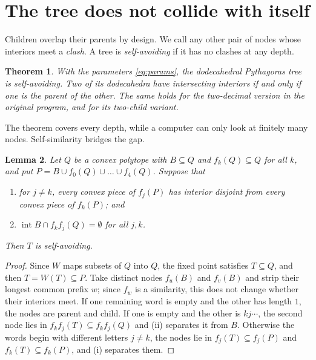 \documentclass[12pt]{article}
\theoremstyle{plain}
\newtheorem{theorem}{Theorem}
\newtheorem{lemma}[theorem]{Lemma}
\theoremstyle{remark}
\newcommand{\inter}{\operatorname{int}}
\begin{document}
\section{The tree does not collide with itself}\label{sec:avoid}

Children overlap their parents by design.  We call any other pair of nodes
whose interiors meet a \emph{clash}.  A tree is \emph{self-avoiding} if it has
no clashes at any depth.

\begin{theorem}\label{thm:avoid}
With the parameters \eqref{eq:params}, the dodecahedral Pythagoras tree is
self-avoiding.  Two of its dodecahedra have intersecting interiors if and only
if one is the parent of the other.  The same holds for the two-decimal version
in the original program, and for its two-child variant.
\end{theorem}

The theorem covers every depth, while a computer can only look at finitely many
nodes.  Self-similarity bridges the gap.

\begin{lemma}\label{lem:reduction}
Let $Q$ be a convex polytope with $B\subseteq Q$ and $f_k(Q)\subseteq Q$ for all
$k$, and put $P=B\cup f_0(Q)\cup\dots\cup f_4(Q)$.  Suppose that
\begin{enumerate}
\item[(i)] for $j\ne k$, every convex piece of $f_j(P)$ has interior disjoint
from every convex piece of $f_k(P)$; and
\item[(ii)] $\inter B\cap f_kf_j(Q)=\emptyset$ for all $j,k$.
\end{enumerate}
Then $T$ is self-avoiding.
\end{lemma}

\begin{proof}
Since $W$ maps subsets of $Q$ into $Q$, the fixed point satisfies $T\subseteq Q$,
and then $T=W(T)\subseteq P$.  Take distinct nodes $f_u(B)$ and $f_v(B)$ and
strip their longest common prefix $w$; since $f_w$ is a similarity, this does
not change whether their interiors meet.  If one remaining word is empty and
the other has length $1$, the nodes are parent and child.  If one is empty and
the other is $kj\cdots$, the second node lies in $f_kf_j(T)\subseteq f_kf_j(Q)$
and (ii) separates it from $B$.  Otherwise the words begin with different
letters $j\neq k$, the nodes lie in $f_j(T)\subseteq f_j(P)$ and
$f_k(T)\subseteq f_k(P)$, and (i) separates them.
\end{proof}
\end{document}
